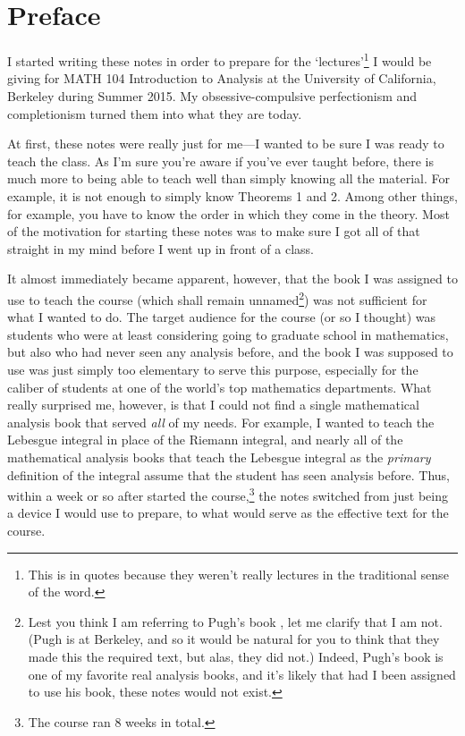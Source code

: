\chapter*{Preface}


I started writing these notes in order to prepare for the `lectures'\footnote{This is in quotes because they weren't really lectures in the traditional sense of the word.} I would be giving for MATH 104 Introduction to Analysis at the University of California, Berkeley during Summer 2015.  My obsessive-compulsive perfectionism and completionism turned them into what they are today.

At first, these notes were really just for me---I wanted to be sure I was ready to teach the class.  As I'm sure you're aware if you've ever taught before, there is much more to being able to teach well than simply knowing all the material.  For example, it is not enough to simply know Theorems 1 and 2.  Among other things, for example, you have to know the order in which they come in the theory.  Most of the motivation for starting these notes was to make sure I got all of that straight in my mind before I went up in front of a class.

It almost immediately became apparent, however, that the book I was assigned to use to teach the course (which shall remain unnamed\footnote{Lest you think I am referring to Pugh's book \cite{Pugh}, let me clarify that I am not.  (Pugh is at Berkeley, and so it would be natural for you to think that they made this the required text, but alas, they did not.)  Indeed, Pugh's book is one of my favorite real analysis books, and it's likely that had I been assigned to use his book, these notes would not exist.}\textellipsis ) was not sufficient for what I wanted to do.  The target audience for the course (or so I thought) was students who were at least considering going to graduate school in mathematics, but also who had never seen any analysis before, and the book I was supposed to use was just simply too elementary to serve this purpose, especially for the caliber of students at one of the world's top mathematics departments.  What really surprised me, however, is that I could not find a single mathematical analysis book that served \emph{all} of my needs.  For example, I wanted to teach the Lebesgue integral in place of the Riemann integral, and nearly all of the mathematical analysis books that teach the Lebesgue integral as the \emph{primary} definition of the integral assume that the student has seen analysis before.  Thus, within a week or so after started the course,\footnote{The course ran 8 weeks in total.} the notes switched from just being a device I would use to prepare, to what would serve as the effective text for the course.

